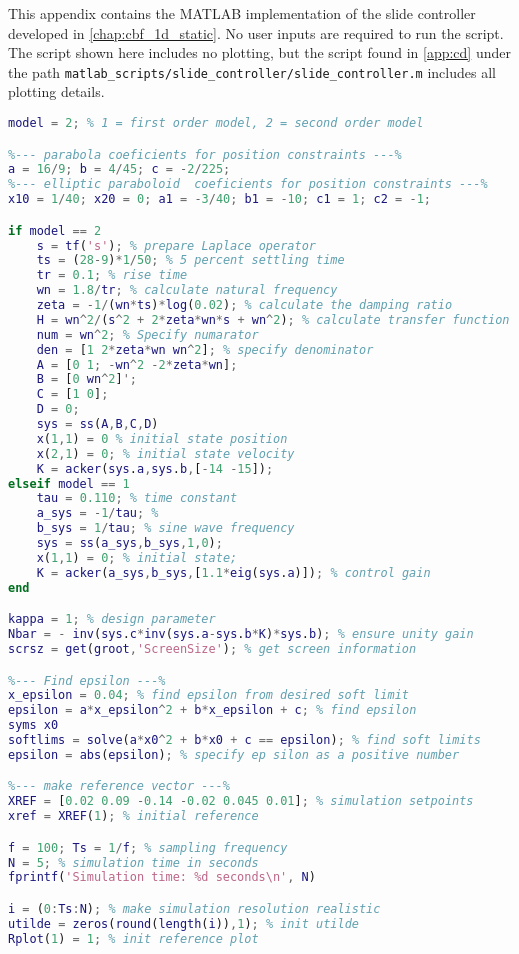 This appendix contains the MATLAB implementation of the slide controller developed in \autoref{chap:cbf_1d_static}. No user inputs are required to run the script. The script shown here includes no plotting, but the script found in \autoref{app:cd} under the path \texttt{matlab\_scripts/slide\_controller/slide\_controller.m} includes all plotting details.
\begin{lstlisting}[language=matlab]
model = 2; % 1 = first order model, 2 = second order model

%--- parabola coeficients for position constraints ---%
a = 16/9; b = 4/45; c = -2/225; 
%--- elliptic paraboloid  coeficients for position constraints ---%
x10 = 1/40; x20 = 0; a1 = -3/40; b1 = -10; c1 = 1; c2 = -1;

if model == 2
    s = tf('s'); % prepare Laplace operator
    ts = (28-9)*1/50; % 5 percent settling time
    tr = 0.1; % rise time
    wn = 1.8/tr; % calculate natural frequency
    zeta = -1/(wn*ts)*log(0.02); % calculate the damping ratio
    H = wn^2/(s^2 + 2*zeta*wn*s + wn^2); % calculate transfer function
    num = wn^2; % Specify numarator
    den = [1 2*zeta*wn wn^2]; % specify denominator
    A = [0 1; -wn^2 -2*zeta*wn];
    B = [0 wn^2]';
    C = [1 0];
    D = 0;
    sys = ss(A,B,C,D)
    x(1,1) = 0 % initial state position
    x(2,1) = 0; % initial state velocity
    K = acker(sys.a,sys.b,[-14 -15]);
elseif model == 1
    tau = 0.110; % time constant
    a_sys = -1/tau; %
    b_sys = 1/tau; % sine wave frequency
    sys = ss(a_sys,b_sys,1,0);
    x(1,1) = 0; % initial state;
    K = acker(a_sys,b_sys,[1.1*eig(sys.a)]); % control gain   
end

kappa = 1; % design parameter
Nbar = - inv(sys.c*inv(sys.a-sys.b*K)*sys.b); % ensure unity gain
scrsz = get(groot,'ScreenSize'); % get screen information

%--- Find epsilon ---%
x_epsilon = 0.04; % find epsilon from desired soft limit
epsilon = a*x_epsilon^2 + b*x_epsilon + c; % find epsilon
syms x0
softlims = solve(a*x0^2 + b*x0 + c == epsilon); % find soft limits
epsilon = abs(epsilon); % specify ep silon as a positive number

%--- make reference vector ---%
XREF = [0.02 0.09 -0.14 -0.02 0.045 0.01]; % simulation setpoints
xref = XREF(1); % initial reference

f = 100; Ts = 1/f; % sampling frequency
N = 5; % simulation time in seconds
fprintf('Simulation time: %d seconds\n', N)

i = (0:Ts:N); % make simulation resolution realistic
utilde = zeros(round(length(i)),1); % init utilde
Rplot(1) = 1; % init reference plot


\end{lstlisting}
